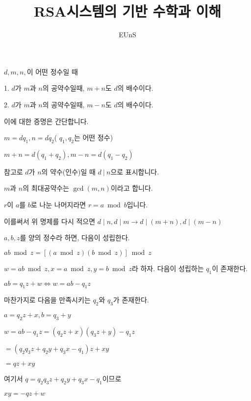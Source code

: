 \documentclass{oblivoir}
\begin{document}
\par
\title{RSA시스템의 기반 수학과 이해}
\author{ EUnS }
\maketitle

\chapter{}
\begin{justbox}
$d,m,n,$이 어떤 정수일 때 \par
1. $d$가 $m$과 $n$의 공약수일때, $m+n$도 $d$의 배수이다.
\par
2. $d$가 $m$과 $n$의 공약수일때, $m-n$도 $d$의 배수이다.
\end{justbox}
이에 대한 증명은 간단합니다. \par
$m=dq_1 , n = dq_2$( $q_1,q_2$는 어떤 정수)\par
$m+n = d(q_1 + q_2) , m-n=d(q_1-q_2)$ \par
참고로 $d$가 $n$의 약수(인수)일 때 $d\: |\: n$으로 표시합니다.
\par 
$m$과 $n$의 최대공약수는 $\gcd(m,n)$이라고 합니다.\par
$r$이 $a$를 $b$로 나눈 나머지라면  $r=a\bmod b$입니다. \par
이를써서 위 명제를 다시 적으면 $d\mid n , d\mid m  \longrightarrow d \mid (m+n), d\mid (m-n)$
\newpage
\begin{justbox}
$a,b,z$를 양의 정수라 하면, 다음이 성립한다.
\begin{center}
    $ab\bmod z= [(a\bmod z)(b \bmod z)]\bmod z$
\end{center}
\end{justbox}
$w = ab\bmod z, x =a \bmod z, y=b\bmod z$라 하자.
다음이 성립하는 $q_1$이 존재한다.
\begin{center}
    $ab=q_1z+w \Longleftrightarrow w=ab-q_1 z$
\end{center}
마찬가지로 다음을 만족시키는 $q_2$와 $q_3$가 존재한다.
\begin{center}
    $a=q_2 z + x , b=q_3 +y$
    \par
    $w = ab-q_1 z = (q_2z+x)(q_3z+y)-q_1z$\par $=(q_2q_3z+q_2y+q_3x-q_1)z+xy$\par
    $=qz+xy$
\end{center}
여기서 $q=q_2q_3z+q_2y+q_3x-q_1$이므로 
\begin{center}
    $xy=-qz+w$
\end{center}
\end{document}
